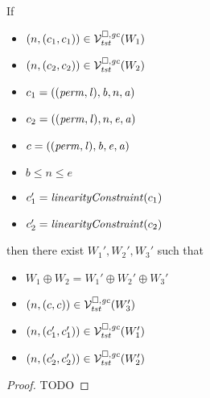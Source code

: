 \begin{lemma}
  \label{lem:splitting-safety-normal}
  If
  \begin{itemize}
  \item $\left(n,(c_1,c_1)\right) \in \mathcal{V}^{\square,\mathit{gc}}_{\mathit{tst}}(W_1)$
  \item $\left(n,(c_2,c_2)\right) \in \mathcal{V}^{\square,\mathit{gc}}_{\mathit{tst}}(W_2)$
  \item $c_1 = ((\mathit{perm},\mathit{l}),\mathit{b},n,\mathit{a})$
  \item $c_2 = ((\mathit{perm},\mathit{l}),n,\mathit{e},\mathit{a})$
  \item $c = ((\mathit{perm},\mathit{l}),\mathit{b},\mathit{e},\mathit{a})$
  \item $b \le n \le e$
  \item $c_1' = \linCons{c_1}$
  \item $c_2' = \linCons{c_2}$
  \end{itemize}
  then there exist $W_1',W_2',W_3'$ such that
  \begin{itemize}
  \item $W_1 \oplus W_2 = W_1' \oplus W_2' \oplus W_3'$
  \item $\left(n,(c,c)\right) \in \mathcal{V}^{\square,\mathit{gc}}_{\mathit{tst}}(W_3')$
  \item $\left(n,(c_1',c_1')\right) \in \mathcal{V}^{\square,\mathit{gc}}_{\mathit{tst}}(W_1')$
  \item $\left(n,(c_2',c_2')\right) \in \mathcal{V}^{\square,\mathit{gc}}_{\mathit{tst}}(W_2')$
  \end{itemize}
\end{lemma}
\begin{proof}
  TODO
\end{proof}

